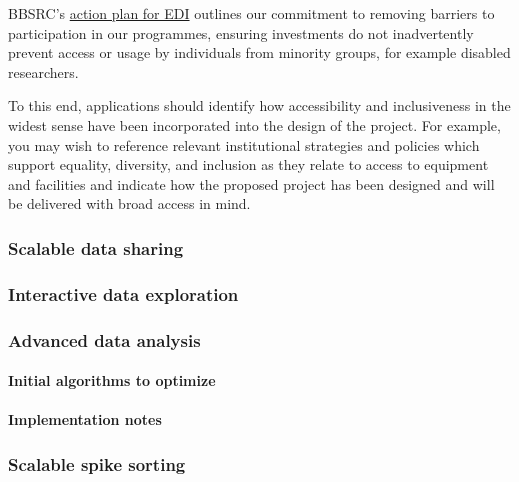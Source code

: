 \begin{instruction}
\begin{itemize}
\end{itemize}

BBSRC’s
\href{https://www.ukri.org/publications/bbsrc-equality-diversity-and-inclusion-action-plan/bbsrc-action-plan-for-equality-diversity-and-inclusion-in-the-biosciences-2022-to-2025/}{action
plan for EDI} outlines our commitment to removing barriers to participation in
our programmes, ensuring investments do not inadvertently prevent access or
usage by individuals from minority groups, for example disabled researchers.

To this end, applications should identify how accessibility and inclusiveness
in the widest sense have been incorporated into the design of the project. For
example, you may wish to reference relevant institutional strategies and
policies which support equality, diversity, and inclusion as they relate to
access to equipment and facilities and indicate how the proposed project has
been designed and will be delivered with broad access in mind.

\end{instruction}

\subsubsection{Scalable data sharing}

\subsubsection{Interactive data exploration}

\subsubsection{Advanced data analysis}



\paragraph{Initial algorithms to optimize}

\paragraph{Implementation notes}
\subsubsection{Scalable spike sorting}

